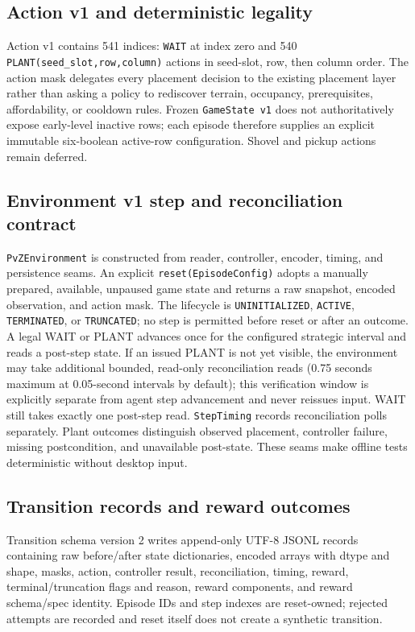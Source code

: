 \documentclass[11pt,a4paper]{article}
\begin{document}
\subsection{Action v1 and deterministic legality}
Action v1 contains 541 indices: \texttt{WAIT} at index zero and 540 \texttt{PLANT(seed\_slot,row,column)} actions in seed-slot, row, then column order. The action mask delegates every placement decision to the existing placement layer rather than asking a policy to rediscover terrain, occupancy, prerequisites, affordability, or cooldown rules. Frozen \texttt{GameState v1} does not authoritatively expose early-level inactive rows; each episode therefore supplies an explicit immutable six-boolean active-row configuration. Shovel and pickup actions remain deferred.

\subsection{Environment v1 step and reconciliation contract}
\texttt{PvZEnvironment} is constructed from reader, controller, encoder, timing, and persistence seams. An explicit \texttt{reset(EpisodeConfig)} adopts a manually prepared, available, unpaused game state and returns a raw snapshot, encoded observation, and action mask. The lifecycle is \texttt{UNINITIALIZED}, \texttt{ACTIVE}, \texttt{TERMINATED}, or \texttt{TRUNCATED}; no step is permitted before reset or after an outcome. A legal WAIT or PLANT advances once for the configured strategic interval and reads a post-step state. If an issued PLANT is not yet visible, the environment may take additional bounded, read-only reconciliation reads (0.75 seconds maximum at 0.05-second intervals by default); this verification window is explicitly separate from agent step advancement and never reissues input. WAIT still takes exactly one post-step read. \texttt{StepTiming} records reconciliation polls separately. Plant outcomes distinguish observed placement, controller failure, missing postcondition, and unavailable post-state. These seams make offline tests deterministic without desktop input.

\subsection{Transition records and reward outcomes}
Transition schema version 2 writes append-only UTF-8 JSONL records containing raw before/after state dictionaries, encoded arrays with dtype and shape, masks, action, controller result, reconciliation, timing, reward, terminal/truncation flags and reason, reward components, and reward schema/spec identity. Episode IDs and step indexes are reset-owned; rejected attempts are recorded and reset itself does not create a synthetic transition.
\end{document}
